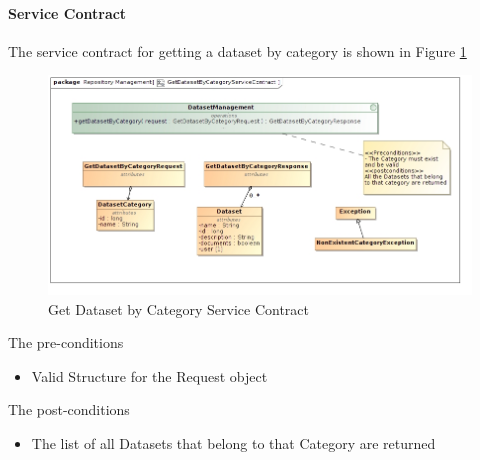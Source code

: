 \paragraph{Service Contract}
The service contract for getting a dataset by category is shown in Figure \ref{fig:getDatasetByCategoryService}
\begin{figure}[H]
  \begin{center}
  \includegraphics[scale=0.6]{../Diagrams and Charts/Test Data/GetDatasetByCategoryServiceContract.jpg}
  \caption{Get Dataset by Category Service Contract}
  \label{fig:getDatasetByCategoryService}
  \end{center}
  
\end{figure}

The pre-conditions
\begin{itemize}
  \item Valid Structure for the Request object
\end{itemize}

The post-conditions
\begin{itemize}
  \item The list of all Datasets that belong to that Category are returned
\end{itemize}

